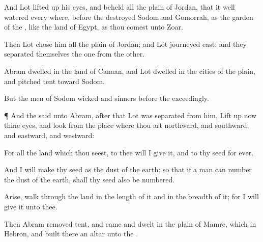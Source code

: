 {\par }{\PP {}And
Lot lifted
up his
eyes, and
beheld all the
plain of
Jordan, that it
{} well
watered every where,
before the
{}
destroyed
Sodom and
Gomorrah,
{} as the
garden of the
{}, like the
land of
Egypt, as thou
comest unto
Zoar.

Then
Lot
chose him all the
plain of
Jordan; and
Lot
journeyed
east: and they separated
themselves the
one from the
other.

Abram
dwelled in the
land of
Canaan, and
Lot
dwelled in the
cities of the
plain, and pitched
{}
tent
toward
Sodom.

But the
men of
Sodom
{}
wicked and
sinners before the
{}
exceedingly.


\par }{\PP {}¶ And the
{}
said unto
Abram,
after that
Lot was
separated from him, Lift
up now thine
eyes, and
look from the
place where thou art
northward, and
southward, and
eastward, and
westward:

For all the
land which thou
seest, to thee will I give
it, and to thy
seed
for
ever.

And I will
make thy
seed as the
dust of the
earth: so
that if a
man
can
number the
dust of the
earth,
{} shall thy
seed also be
numbered.

Arise,
walk through the
land in the
length of it and in the
breadth of it; for I will
give it unto thee.

Then
Abram removed
{}
tent, and
came and
dwelt in the
plain of
Mamre, which
{} in
Hebron, and
built there an
altar unto the
{}.




\par }
